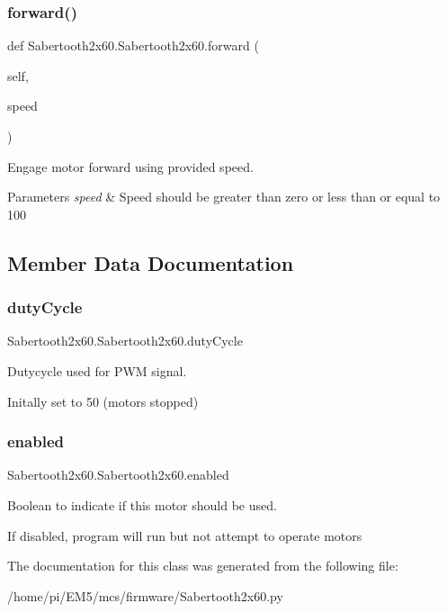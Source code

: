\subsubsection{\texorpdfstring{forward()}{forward()}}
{\footnotesize\ttfamily def Sabertooth2x60.\+Sabertooth2x60.\+forward (\begin{DoxyParamCaption}\item[{}]{self,  }\item[{}]{speed }\end{DoxyParamCaption})}



Engage motor forward using provided speed. 


\begin{DoxyParams}{Parameters}
{\em speed} & Speed should be greater than zero or less than or equal to 100 \\
\hline
\end{DoxyParams}


\subsection{Member Data Documentation}
\mbox{\label{classSabertooth2x60_1_1Sabertooth2x60_a34c1bb9f34b39e987f4139754fb074d4}} 
\subsubsection{\texorpdfstring{duty\+Cycle}{dutyCycle}}
{\footnotesize\ttfamily Sabertooth2x60.\+Sabertooth2x60.\+duty\+Cycle}



Dutycycle used for P\+WM signal. 

Initally set to 50 (motors stopped) \mbox{\label{classSabertooth2x60_1_1Sabertooth2x60_ade2a3348f9fd5f960b679baa0651ce4c}} 
\subsubsection{\texorpdfstring{enabled}{enabled}}
{\footnotesize\ttfamily Sabertooth2x60.\+Sabertooth2x60.\+enabled}



Boolean to indicate if this motor should be used. 

If disabled, program will run but not attempt to operate motors 

The documentation for this class was generated from the following file\+:\begin{DoxyCompactItemize}
\item 
/home/pi/\+E\+M5/mcs/firmware/Sabertooth2x60.\+py\end{DoxyCompactItemize}
